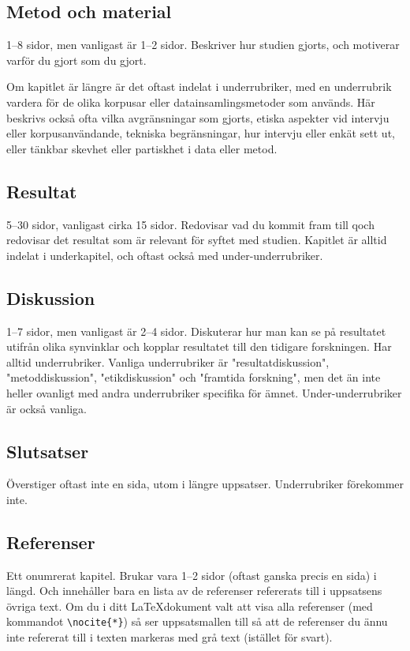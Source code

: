 \subsection{Metod och material}
\label{rubrik.metod}

1--8 sidor, men vanligast är 1--2 sidor. Beskriver hur studien gjorts, och
motiverar varför du gjort som du gjort.

Om kapitlet är längre är det oftast indelat i underrubriker, med en underrubrik
vardera för de olika korpusar eller datainsamlingsmetoder som används. Här
beskrivs också ofta vilka avgränsningar som gjorts, etiska aspekter vid
intervju eller korpusanvändande, tekniska begränsningar, hur intervju eller
enkät sett ut, eller tänkbar skevhet eller partiskhet i data eller metod.


\subsection{Resultat}
\label{rubrik.resultat}

5--30 sidor, vanligast cirka 15 sidor. Redovisar vad du kommit fram till qoch
redovisar det resultat som är relevant för syftet med studien. Kapitlet är
alltid indelat i underkapitel, och oftast också med under-underrubriker.


\subsection{Diskussion}
\label{rubrik.diskussion}

1--7 sidor, men vanligast är 2--4 sidor. Diskuterar hur man kan se på
resultatet utifrån olika synvinklar och kopplar resultatet till den tidigare
forskningen. Har alltid underrubriker. Vanliga underrubriker är
"resultatdiskussion", "metoddiskussion", "etikdiskussion" och "framtida
forskning", men det än inte heller ovanligt med andra underrubriker specifika
för ämnet. Under-underrubriker är också vanliga.


\subsection{Slutsatser}
\label{rubrik.slutsats}

Överstiger oftast inte en sida, utom i längre uppsatser. Underrubriker
förekommer inte.


\subsection{Referenser}
\label{rubrik.referenser}

Ett onumrerat kapitel. Brukar vara 1--2 sidor (oftast ganska precis en sida) i
längd. Och innehåller bara en lista av de referenser refererats till i
uppsatsens övriga text. Om du i ditt \LaTeX dokument valt att visa alla
referenser (med kommandot \verb|\nocite{*}|) så ser uppsatsmallen till så att
de referenser du ännu inte refererat till i texten markeras med grå text
(istället för svart).

